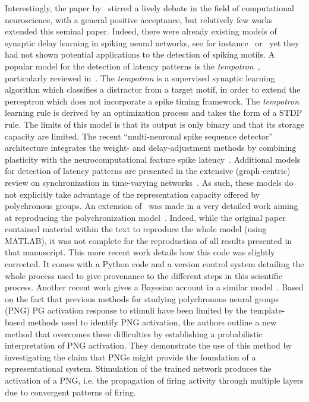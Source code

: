 \documentclass[brainsci, %
               review,submit,pdftex,moreauthors
               ]{Definitions/mdpi}
\begin{document}
Interestingly, the paper by~\citep{izhikevich_polychronization_2006} stirred a lively debate in the field of computational neuroscience, with a general positive acceptance, but relatively few works extended this seminal paper. Indeed, there were already existing models of synaptic delay learning in spiking neural networks, see for instance~\citep{huning_synaptic_1998} or~\citep{eurich_dynamics_1999} yet they had not shown potential applications to the detection of spiking motifs. A popular model for the detection of latency patterns is the \emph{tempotron}~\citep{gutig_tempotron_2006}, particularly reviewed in~\citep{gutig_spike_2014}. The \emph{tempotron} is a supervised synaptic learning algorithm which classifies a distractor from a target motif, in order to extend the perceptron which does not incorporate a spike timing framework. The \emph{tempotron} learning rule is derived by an optimization process and takes the form of a STDP rule. The limits of this model is that its output is only binary and that its storage capacity are limited. The recent ``multi-neuronal spike sequence detector'' architecture integrates the weight- and delay-adjustment methods by combining plasticity with the neurocomputational feature spike latency~\citep{susi_nmnsd-spiking_2021}. Additional models for detection of latency patterns are presented in the extensive (graph-centric) review on synchronization in time-varying networks~\citep{ghosh_synchronization_2021,ghosh_synchronized_2022}. As such, these models do not explicitly take advantage of the representation capacity offered by polychronous groups. 
%
%
An extension of~\citep{izhikevich_polychronization_2006} was made in a very detailed work aiming at reproducing the polychronization model~\citep{pauli_reproducing_2018}. Indeed, while the original paper contained material within the text to reproduce the whole model (using MATLAB), it was not complete for the reproduction of all results presented in that manuscript. This more recent work details how this code was slightly corrected. It comes with a Python code and a version control system detailing the whole process used to give provenance to the different steps in this scientific process.
%
Another recent work gives a Bayesian account in a similar model~\citep{guise_bayesian_2014}. Based on the fact that previous methods for studying polychronous neural groups (PNG) PG activation response to stimuli have been limited by the template-based methods used to identify PNG activation, the authors outline a new method that overcomes these difficulties by establishing a probabilistic interpretation of PNG activation. They demonstrate the use of this method by investigating the claim that PNGs might provide the foundation of a representational system. Stimulation of the trained network produces the activation of a PNG, i.e. the propagation of firing activity through multiple layers due to convergent patterns of firing.
\end{document}
